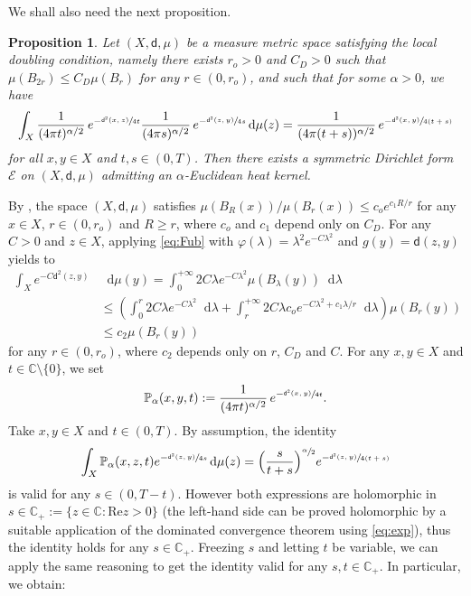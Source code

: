 \documentclass[10pt]{amsart}
\let\sep:
\theoremstyle{plain}
\newtheorem{proposition}[theorem]{Proposition}
\theoremstyle{definition}
\newcommand{\setC}{\mathbb{C}}
\newcommand{\bP}{\mathbb{P}}
\newcommand{\cE}{\mathcal{E}}
\let\phi\varphi
\newcommand{\di}{\mathop{}\!\mathrm{d}}
\newcommand{\dist}{\mathsf{d}}
\begin{document}
We shall also need the next proposition.
\begin{proposition}\label{prop:5.3} Let $(X,\dist,\mu)$ be a measure metric space satisfying the local doubling condition, namely there exists $r_o>0$ and $C_D>0$ such that $\mu(B_{2r}) \le C_D \mu(B_r)$ for any $r \in (0,r_o)$, and such that for some $\alpha >0$, we have
\[
\int_X \frac{1}{(4 \pi t)^{\alpha/2}}\, e^{-\sfrac{\dist^2(x,z)}{4t}}\frac{1}{(4 \pi s)^{\alpha/2}}\, e^{-\sfrac{\dist^2(z,y)}{4s}} \di \mu(z)=\frac{1}{(4 \pi (t+s))^{\alpha/2}}\, e^{-\sfrac{\dist^2(x,y)}{4(t+s)}}
\]
for all $x,y \in X$ and $t,s \in (0,T)$. Then there exists a symmetric Dirichlet form $\cE$ on $(X,\dist,\mu)$ admitting an $\alpha$-Euclidean heat kernel.
\end{proposition}
\proof By \cite[Lem.\,3.9]{Carron}, the space $(X,\dist,\mu)$ satisfies $
\mu(B_R(x))/\mu(B_r(x)) \le c_o e^{c_1 R/r}$ for any $x \in X$, $r\in(0,r_o)$ and $R\ge r$, where $c_o$ and $c_1$ depend only on $C_D$. For any $C>0$ and $z \in X$, applying \eqref{eq:Fub} with $\phi(\lambda)=\lambda^2 e^{-C\lambda^2}$ and $g(y)=\dist(z,y)$ yields to
\begin{equation}
\begin{aligned}\label{eq:exp}
\int_X e^{-C\dist^2(z,y)}&\di \mu(y) = \int_0^{+\infty} 2 C \lambda e^{-C\lambda^2} \mu(B_\lambda(y))\di \lambda \\
& \le \left(\int_0^r 2 C \lambda e^{-C\lambda^2} \di \lambda + \int_r^{+\infty} 2 C \lambda c_o e^{-C\lambda^2 + c_1 \lambda/r} \di \lambda\right)\mu(B_r(y)) \\
& \le c_2 \mu(B_r(y))
\end{aligned}
\end{equation}
for any $r \in(0,r_o)$, where $c_2$ depends only on $r$, $C_D$ and $C$. For any $x,y\in X$ and $t\in \setC\setminus \{0\}$,
we set
\[
\bP_\alpha(x,y,t):=\frac{1}{(4 \pi t)^{\alpha/2}}\, e^{-\sfrac{\dist^2(x,y)}{4t}}.
\]
Take $x,y \in X$ and $t\in(0,T)$. By assumption, the identity
\[
\int_X \bP_\alpha(x,z,t)e^{-\sfrac{\dist^2(z,y)}{4s}}\di \mu(z)= \Bigl(\frac{s}{t+s}\Bigr)^{\sfrac \alpha2}e^{-\sfrac{\dist^2(z,y)}{4(t+s)}}
\]
is valid for any $s \in (0,T-t)$. However both expressions are holomorphic in $s\in \setC_+:=\{z\in \setC\sep \mathrm{Re} z>0\}$ (the left-hand side can be proved holomorphic by a suitable application of the dominated convergence theorem using \eqref{eq:exp}), thus the identity holds for any $s\in \setC_+$. Freezing $s$ and letting $t$ be variable, we can apply the same reasoning to get the identity valid for any $s, t \in \setC_+$. In particular, we obtain:
\end{document}
